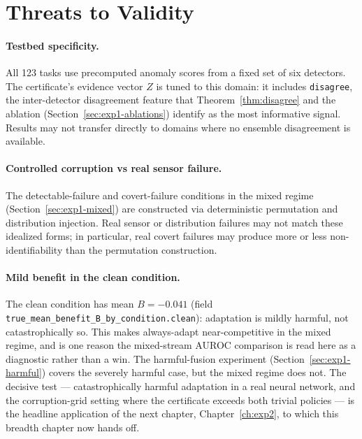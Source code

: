 \section{Threats to Validity}
\label{sec:exp1-threats}

\paragraph{Testbed specificity.}
All 123 tasks use precomputed anomaly scores from a fixed set of six detectors.  The
certificate's evidence vector $Z$ is tuned to this domain: it includes
\texttt{disagree}, the inter-detector disagreement feature that Theorem~\ref{thm:disagree}
and the ablation (Section~\ref{sec:exp1-ablations}) identify as the most informative
signal.  Results may not transfer directly to domains where no ensemble disagreement is
available.

\paragraph{Controlled corruption vs real sensor failure.}
The detectable-failure and covert-failure conditions in the mixed regime
(Section~\ref{sec:exp1-mixed}) are constructed via deterministic permutation and
distribution injection.  Real sensor or distribution failures may not match these
idealized forms; in particular, real covert failures may produce more or less
non-identifiability than the permutation construction.

\paragraph{Mild benefit in the clean condition.}
The clean condition has mean $B = -0.041$ (field
\texttt{true\_mean\_benefit\_B\_by\_condition.clean}): adaptation is mildly harmful, not
catastrophically so.  This makes always-adapt near-competitive in the mixed regime, and is
one reason the mixed-stream AUROC comparison is read here as a diagnostic rather than a
win.  The harmful-fusion experiment (Section~\ref{sec:exp1-harmful}) covers the severely
harmful case, but the mixed regime does not.  The decisive test --- catastrophically
harmful adaptation in a real neural network, and the corruption-grid setting where the
certificate exceeds both trivial policies --- is the headline application of the next
chapter, Chapter~\ref{ch:exp2}, to which this breadth chapter now hands off.

